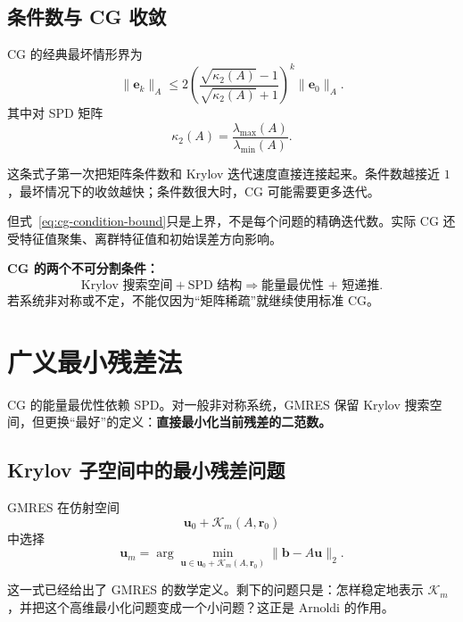 \subsection{条件数与 CG 收敛}

CG 的经典最坏情形界为
\begin{equation}
\boxed{
\|\bm e_k\|_A
\le
2
\left(
\frac{\sqrt{\kappa_2(A)}-1}{\sqrt{\kappa_2(A)}+1}
\right)^k
\|\bm e_0\|_A.
}
\label{eq:cg-condition-bound}
\end{equation}
其中对 SPD 矩阵
\begin{equation}
\kappa_2(A)
=
\frac{\lambda_{\max}(A)}{\lambda_{\min}(A)}.
\end{equation}

这条式子第一次把矩阵条件数和 Krylov 迭代速度直接连接起来。条件数越接近 $1$，最坏情况下的收敛越快；条件数很大时，CG 可能需要更多迭代。

但式~\eqref{eq:cg-condition-bound}只是上界，不是每个问题的精确迭代数。实际 CG 还受特征值聚集、离群特征值和初始误差方向影响。

\begin{keybox}
\textbf{CG 的两个不可分割条件：}
\[
\boxed{
\text{Krylov 搜索空间}
+
\text{SPD 结构}
\Longrightarrow
\text{能量最优性 + 短递推}.
}
\]
若系统非对称或不定，不能仅因为“矩阵稀疏”就继续使用标准 CG。
\end{keybox}

\section{广义最小残差法}
\label{sec:gmres}

CG 的能量最优性依赖 SPD。对一般非对称系统，GMRES 保留 Krylov 搜索空间，但更换“最好”的定义：\textbf{直接最小化当前残差的二范数。}

\subsection{Krylov 子空间中的最小残差问题}

GMRES 在仿射空间
\begin{equation}
\bm u_0+\mathcal K_m(A,\bm r_0)
\end{equation}
中选择
\begin{equation}
\boxed{
\bm u_m
=
\arg\min_{\bm u\in\bm u_0+\mathcal K_m(A,\bm r_0)}
\|\bm b-A\bm u\|_2.
}
\label{eq:gmres-optimality}
\end{equation}

这一式已经给出了 GMRES 的数学定义。剩下的问题只是：怎样稳定地表示 $\mathcal K_m$，并把这个高维最小化问题变成一个小问题？这正是 Arnoldi 的作用。

